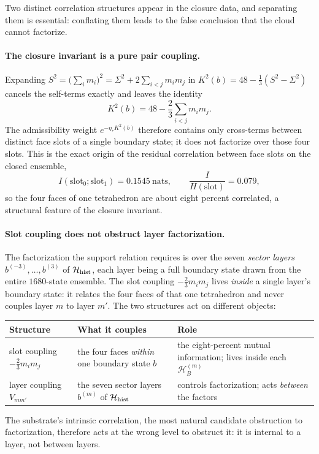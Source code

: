 \documentclass[11pt]{article}
\begin{document}
Two distinct correlation structures appear in the closure data, and separating them is essential: conflating them leads to the false conclusion that the cloud cannot factorize.

\paragraph{The closure invariant is a pure pair coupling.}
Expanding $S^2=\bigl(\sum_i m_i\bigr)^2=\Sigma^2+2\sum_{i<j}m_im_j$ in $K^2(b)=48-\tfrac13(S^2-\Sigma^2)$ cancels the self-terms exactly and leaves the identity
\[
K^2(b)=48-\frac23\sum_{i<j}m_im_j.
\]
The admissibility weight $e^{-\eta_*K^2(b)}$ therefore contains only cross-terms between distinct face slots of a single boundary state; it does not factorize over those four slots. This is the exact origin of the residual correlation between face slots on the closed ensemble,
\[
I(\text{slot}_0;\text{slot}_1)=0.1545~\text{nats},
\qquad
\frac{I}{H(\text{slot})}=0.079,
\]
so the four faces of one tetrahedron are about eight percent correlated, a structural feature of the closure invariant.

\paragraph{Slot coupling does not obstruct layer factorization.}
The factorization the support relation requires is over the seven \emph{sector layers} $b^{(-3)},\ldots,b^{(3)}$ of $\mathcal H_{\rm hist}$, each layer being a full boundary state drawn from the entire $1680$-state ensemble. The slot coupling $-\tfrac23 m_im_j$ lives \emph{inside} a single layer's boundary state: it relates the four faces of that one tetrahedron and never couples layer $m$ to layer $m'$. The two structures act on different objects:
\begin{center}
\small
\begin{tabular}{p{}p{}p{}}
\hline
Structure & What it couples & Role \\
\hline
slot coupling $-\tfrac23 m_im_j$ & the four faces \emph{within} one boundary state $b$ & the eight-percent mutual information; lives inside each $\mathcal H_B^{(m)}$ \\
layer coupling $V_{mm'}$ & the seven sector layers $b^{(m)}$ of $\mathcal H_{\rm hist}$ & controls factorization; acts \emph{between} the factors \\
\hline
\end{tabular}
\normalsize
\end{center}
The substrate's intrinsic correlation, the most natural candidate obstruction to factorization, therefore acts at the wrong level to obstruct it: it is internal to a layer, not between layers.
\end{document}
